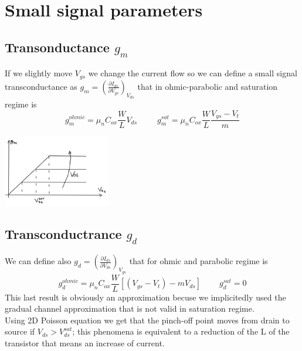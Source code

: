 \section{Small signal parameters}

\subsection{Transonductance $g_m$}
If we slightly move $V_{gs}$ we change the current flow so we can define a small signal transconductance as $g_m=\left(\frac{\partial I_{ds}}{\partial V_{gs}}\right)_{V_{ds}}$ that in ohmic-parabolic and saturation regime is
\begin{equation}
g_m^{ohmic}=\mu_nC_{ox}\frac{W}{L}V_{ds} \ \ \ \ \ \ \ \ \ \ \  g_m^{sat}=\mu_nC_{ox}\frac{W}{L}\frac{V_{gs}-V_t}{m}
\end{equation} 

\centering
\includegraphics[width=0.35\textwidth]{gmmos.png}\\
\raggedright

\subsection{Transconductrance $g_d$}
We can define also $g_d=\left(\frac{\partial I_{ds}}{\partial V_{ds}}\right)_{V_{gs}}$ that for ohmic and parabolic regime is
\begin{equation}
g_d^{ohmic}=\mu_nC_{ox}\frac{W}{L}[(V_{gs}-V_t)-mV_{ds}] \ \ \ \ \ \ \ \ \ \ g_d^{sat}=0
\end{equation}
This last result is obviously an approximation becuse we implicitedly used the gradual channel approximation that is not valid in saturation regime.\\
Using 2D Poisson equation we get that the pinch-off point moves from drain to source if $V_{ds}>V_{ds}^{sat}$; this phenomena is equivalent to a reduction of the L of the transistor that means an increase of current.\\

